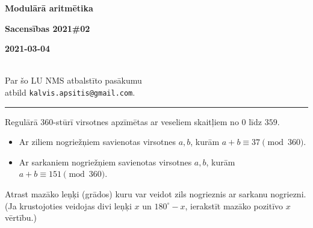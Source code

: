 \documentclass[a4paper,12pt]{article}
\newcommand\answer[1]{}
\begin{document}
\begin{center}
\parbox{3.5cm}{\flushleft\bf Modulārā aritmētika} \hfill {\bf\LARGE Sacensības 2021\#02} \hfill \parbox{3.5cm}{\flushright\bf 2021-03-04} \\[2pt]
{\rm\footnotesize Par šo LU NMS atbalstīto pasākumu\\ atbild {\tt kalvis.apsitis@gmail.com}.}
\end{center}

\hrule




\vspace{10pt}
\begin{problem}
Regulārā $360$-stūrī virsotnes apzīmētas ar veseliem skaitļiem no $0$ līdz $359$. 
\begin{itemize}
\item Ar ziliem nogriežņiem savienotas virsotnes $a,b$, kurām $a+b \equiv 37 \pmod{360}$. 
\item Ar sarkaniem nogriežņiem savienotas virsotnes $a,b$, kurām $a+b \equiv 151 \pmod{360}$. 
\end{itemize}
Atrast mazāko leņķi (grādos) kuru var veidot zils nogrieznis ar sarkanu nogriezni. 
(Ja krustojoties veidojas divi leņķi $x$ un $180^{\circ}-x$, ierakstīt mazāko pozitīvo $x$ vērtību.)
\answer{

{\bf Atbilde.} $\mathtt{57}$.

Apzīmējam virsotnes ar $A_0,A_1,\ldots,A_{359}$. 
Visi zilie nogriežņi ir paralēli nogrieznim $A_{0}A_{37}$, jo $0+37 \equiv 37 \pmod{360}$. Pārceļot šo 
nogriezni paralēli, summas atlikums, dalot ar $360$ nemainās.

Savukārt visi sarkanie nogriežņi ir paralēli nogrieznim 
$A_{37}A_{114}$, jo $37 + 114 \equiv 151 \pmod{360}$) un visi citi sarkanie nogriežņi ir tam paralēli.

Leņķis $\sphericalangle A_0A_{37}A_{114}$ balstās uz riņķa loka $A_0A_{114}$ garākās daļas, kas lielāka par $180^{\circ}$. 
Šis loks ir $360^{\circ} - 114^{\circ} = 246^{\circ}$, tāpēc $\sphericalangle A_0A_{37}A_{114}$ ir puse no tā: $123^{\circ}$. 
Bet tā kā šis leņķis ir plats un jāieraksta mazākā vērtība, ko veido divi krustiski nogriežņi, 
tad mazākais leņķis starp zilu un sarkanu nogriezni ir $180^{\circ} - 123^{\circ} = 57^{\circ}$.
}
\end{problem}
\end{document}
